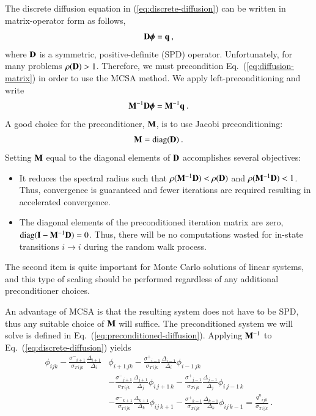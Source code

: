 \documentclass[preprint,12pt]{elsarticle}
\newcommand{\vI}{\ensuremath{\ve{I}}}
\newcommand{\qn}{\ensuremath{q^n}} \newcommand{\Tn}{\ensuremath{T^n}}
\newcommand{\Di}{\ensuremath{\Delta_i}}
\newcommand{\Dj}{\ensuremath{\Delta_j}}
\newcommand{\Dk}{\ensuremath{\Delta_k}}
\newcommand{\sigT}{\ensuremath{\sigma_{T\,ijk}}}
\newcommand{\sigm}{\ensuremath{\sigma^{-}}}
\newcommand{\sigp}{\ensuremath{\sigma^{+}}}
\newcommand{\bphi}{\ensuremath{\boldsymbol{\phi}}}
\DeclareMathOperator{\diag}{diag}
\begin{document}
The discrete diffusion equation in (\ref{eq:discrete-diffusion}) can be
written in matrix-operator form as follows,
\begin{equation}
  \ve{D}\bphi = \ve{q}\:,
  \label{eq:diffusion-matrix}
\end{equation}
where $\mathbf{D}$ is a symmetric, positive-definite (SPD) operator.
Unfortunately, for many problems $\rho(\mathbf{D}) > 1$.  Therefore, we must
precondition Eq.~(\ref{eq:diffusion-matrix}) in order to use the MCSA
method. We apply left-preconditioning and write
\begin{equation}
  \ve{M}^{-1}\ve{D}\bphi = \ve{M}^{-1}\ve{q}\:.
  \label{eq:preconditioned-diffusion}
\end{equation}
A good choice for the preconditioner, $\mathbf{M}$, is to use Jacobi
preconditioning:
\begin{equation}
  \ve{M}=\diag(\ve{D})\:.
  \label{eq:preconditioner}
\end{equation}
Setting $\mathbf{M}$ equal to the diagonal elements of $\mathbf{D}$ accomplishes
several objectives:
\begin{itemize}
\item It reduces the spectral radius such that
  $\rho(\mathbf{M}^{-1}\mathbf{D}) < \rho(\mathbf{D})$ and
  $\rho(\mathbf{M}^{-1}\mathbf{D}) < 1$.  Thus, convergence is guaranteed and
  fewer iterations are required resulting in accelerated convergence.
\item The diagonal elements of the preconditioned iteration matrix are
  zero, $\diag(\vI - \ve{M}^{-1}\ve{D}) = 0$.  Thus, there will be no
  computations wasted for in-state transitions $i\rightarrow i$ during
  the random walk process.
\end{itemize}
The second item is quite important for Monte Carlo solutions of linear
systems, and this type of scaling should be performed regardless of any
additional preconditioner choices. 

An advantage of MCSA is that the resulting system does not have to be SPD,
thus any suitable choice of $\mathbf{M}$ will suffice.  The preconditioned system
we will solve is defined in Eq.~(\ref{eq:preconditioned-diffusion}).  Applying
$\mathbf{M}^{-1}$ to Eq.~(\ref{eq:discrete-diffusion}) yields
\begin{equation}
  \begin{aligned}
    \phi_{ijk} -
    \frac{\sigm_{i+1}}{\sigT}\frac{\Delta_{i+1}}{\Di}&\phi_{i+1\,jk} -
    \frac{\sigp_{i-1}}{\sigT}\frac{\Delta_{i-1}}{\Di}\phi_{i-1\,jk}\\ &-
    \frac{\sigm_{j+1}}{\sigT}\frac{\Delta_{j+1}}{\Dj}\phi_{i\,j+1\,k}
    -\frac{\sigp_{j-1}}{\sigT}\frac{\Delta_{j-1}}{\Dj}\phi_{i\,j-1\,k}\\ &-
    \frac{\sigm_{k+1}}{\sigT}\frac{\Delta_{k+1}}{\Dk}\phi_{ij\,k+1} -
    \frac{\sigp_{k-1}}{\sigT}\frac{\Delta_{k-1}}{\Dk}\phi_{ij\,k-1} =
    \frac{\qn_{ijk}}{\sigT}\:.
  \end{aligned}
  \label{eq:preconditioned-discrete-diffusion}
\end{equation}
\end{document}
